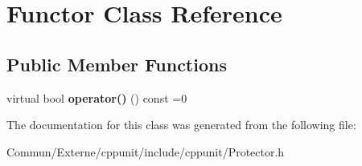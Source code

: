 \hypertarget{class_functor}{}\section{Functor Class Reference}
\label{class_functor}
\subsection*{Public Member Functions}
\begin{DoxyCompactItemize}
\item 
virtual bool {\bfseries operator()} () const  =0\hypertarget{class_functor_a36f20f712e6b220a924d524c05676849}{}\label{class_functor_a36f20f712e6b220a924d524c05676849}

\end{DoxyCompactItemize}


The documentation for this class was generated from the following file\+:\begin{DoxyCompactItemize}
\item 
Commun/\+Externe/cppunit/include/cppunit/Protector.\+h\end{DoxyCompactItemize}
